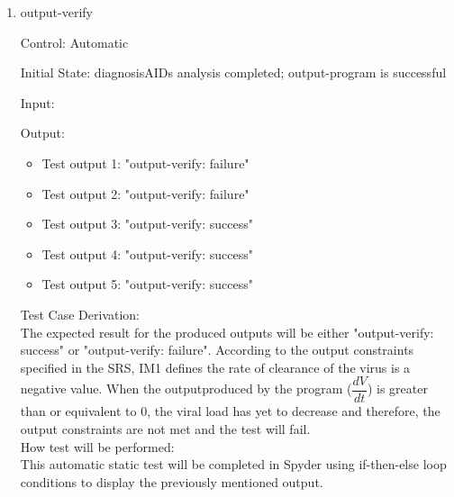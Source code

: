 \documentclass[12pt, titlepage]{article}
\newcounter{tinnum} %
\begin{document}
\begin{enumerate}
\begin{enumerate}
					
\item{output-verify\\}

Control: Automatic
					
Initial State: diagnosisAIDs analysis completed; output-program is successful
					
Input:
\begin{itemize}
\item[Test input \refstepcounter{tinnum}\thetinnum\label{Tinput_16}:] 
$\dfrac{dV}{dt} = 1.3$ %
\item[Test input \refstepcounter{tinnum}\thetinnum\label{Tinput_17}:] 
$\dfrac{dV}{dt} = 0$ %
\item[Test input \refstepcounter{tinnum}\thetinnum\label{Tinput_18}:] 
$\dfrac{dV}{dt} = -0.3$
\item[Test input \refstepcounter{tinnum}\thetinnum\label{Tinput_19}:]
$\dfrac{dV}{dt} = -0.7$ 
\item[Test input \refstepcounter{tinnum}\thetinnum\label{Tinput_20}:]
}$\dfrac{dV}{dt} = -0.9$ 
\end{itemize}


Output: 
\begin{itemize}
\item Test output 1: "output-verify: failure"
\item Test output 2: "output-verify: failure" 
\item Test output 3: "output-verify: success"
\item Test output 4: "output-verify: success"
\item Test output 5: "output-verify: success"
\end{itemize}

Test Case Derivation:\\
The expected result for the produced outputs will be either "output-verify: 
success" or  "output-verify: failure". According to the output constraints 
specified in the SRS, IM1 defines the rate of clearance of the virus is a 
negative value. When the outputproduced by the program ($\dfrac{dV}{dt}$) is 
greater than or equivalent to 0, the viral load has yet to decrease and 
therefore, the output constraints are not met and the test will fail.\\

How test will be performed: \\
This automatic static test will be completed in Spyder using if-then-else loop 
conditions to display the previously mentioned output. \\


\end{enumerate}
\end{enumerate}
\end{document}
